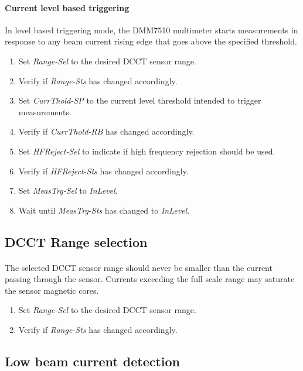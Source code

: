 \documentclass[openany]{article}
\begin{document}
		\paragraph{Current level based triggering} In level based triggering mode, the DMM7510 multimeter starts measurements in response to any beam current rising edge that goes above the specified threshold.

			\begin{enumerate}
				\item Set \emph{Range-Sel} to the desired DCCT sensor range.
				\item Verify if \emph{Range-Sts} has changed accordingly.
				\item Set \emph{CurrThold-SP} to the current level threshold intended to trigger measurements.
				\item Verify if \emph{CurrThold-RB} has changed accordingly.
				\item Set \emph{HFReject-Sel} to indicate if high frequency rejection should be used.
				\item Verify if \emph{HFReject-Sts} has changed accordingly.
				\item Set \emph{MeasTrg-Sel} to \emph{InLevel}.
				\item Wait until \emph{MeasTrg-Sts} has changed to \emph{InLevel}.
			\end{enumerate}

	\subsection{DCCT Range selection}

		\paragraph{} The selected DCCT sensor range should never be smaller than the current passing through the sensor. Currents exceeding the full scale range may saturate the sensor magnetic cores.

			\begin{enumerate}
				\item Set \emph{Range-Sel} to the desired DCCT sensor range.
				\item Verify if \emph{Range-Sts} has changed accordingly.
			\end{enumerate}

	\subsection{Low beam current detection}
\end{document}
